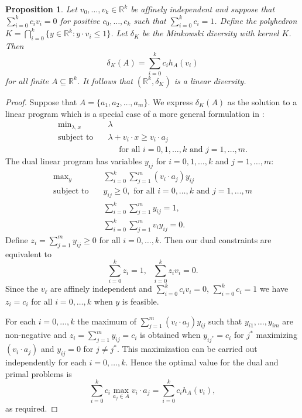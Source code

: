 \documentclass[11pt]{article}
\newtheorem{proposition}[theorem]{Proposition}
\renewcommand{\Re}{\mathbb{R}}
\begin{document}
\begin{proposition} \label{prop:linear_prog_simplex}
Let $v_0,\ldots,v_k \in \Re^k$ be affinely independent and suppose that $\sum_{i=0}^k c_i v_i =0$ for positive 
$c_0,\ldots,c_k$ such that $\sum_{i=0}^k c_i=1$. 
Define the polyhedron  $K = \bigcap_{i=0}^k \{y \in \Re^k:y \cdot v_i \leq 1 \}$. Let $\delta_K$ be the Minkowski diversity with kernel $K$.  
Then
\[
\delta_K(A) =  \sum_{i=0}^k c_i h_A(v_i)
\]
for all finite $A \subseteq \Re^k$. It follows that $(\Re^k,\delta_K)$ is a linear diversity.
\end{proposition}
\begin{proof}
Suppose that  $A = \{a_1,a_2,\ldots,a_m\}$. We express $\delta_K(A)$ as the solution to a linear program which is a special case of a more general formulation in \cite{BrandenbergRoth09}:
\begin{align*}
    \text{min}_{\lambda,x} \quad & \lambda\\
    \text{subject to} \quad 
    & \lambda + v_i \cdot x \geq v_i \cdot a_j \\ &\quad \mbox{ for all }i=0,1,\ldots,k \mbox{ and }j=1,\ldots,m.
\end{align*}
The dual linear program has  variables $y_{ij}$ for $i=0,1,\ldots,k$ and $j=1,\ldots,m$:
\begin{align*}
    \text{max}_y \quad & \sum_{i=0}^k \sum_{j=1}^m (v_i \cdot a_j) y_{ij} \\
    \text{subject to} \quad 
    & y_{ij} \geq 0, \mbox{ for all $i=0,\ldots,k$ and $j=1,\ldots,m$}\\
    & \sum_{i=0}^k \sum_{j=1}^m  y_{ij} = 1, \\
    & \sum_{i=0}^k \sum_{j=1}^m v_i y_{ij} = 0.
\end{align*}
Define $z_i = \sum_{j=1}^m y_{ij} \geq 0$ for all $i=0,\ldots,k$. Then our dual constraints are equivalent to 
\[
\sum_{i=0}^k z_i = 1, \ \ \ \sum_{i=0}^k z_i v_i = 0.
\]
Since the $v_\ell$ are affinely independent and  $\sum_{i=0}^k c_i v_i=0$, $\sum_{i=0}^k c_i=1$ we have $z_i=c_i$ for all $i=0,\ldots,k$ when $y$ is feasible.

For each $i=0,\ldots,k$ the maximum of $\sum_{j=1}^m (v_i \cdot a_j) y_{ij}$ such that $y_{i1},\ldots,y_{im}$ are non-negative and $z_i=\sum_{j=1}^m y_{ij} = c_i$ is obtained when $y_{ij^*} = c_i$ for $j^*$ maximizing $(v_i \cdot a_j)$ and $y_{ij}=0$ for $j \neq j^*$. This maximization can be carried out independently for each $i=0,\ldots,k$. Hence the optimal value for the dual and primal problems is 
\[
 \sum_{i=0}^k c_i \max_{a_j \in A} v_i \cdot a_j =  \sum_{i=0}^k c_i h_A(v_i),
\]
as required.
\end{proof}
\end{document}
